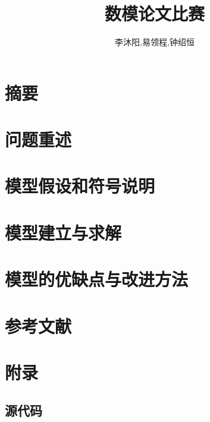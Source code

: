 \documentclass[UTF8]{ctexart}
\title{数模论文比赛}
\author{李沐阳,易领程,钟绍恒}
\begin{document}
\maketitle

\newpage

\tableofcontents


\newpage

\section{摘要}

\section{问题重述}

\section{模型假设和符号说明}

\section{模型建立与求解}

\section{模型的优缺点与改进方法}

\section{参考文献}

\appendix
\setcounter{secnumdepth}{-2} 
\section{附录}

\setcounter{secnumdepth}{3} 

\subsection{源代码}
\end{document}
